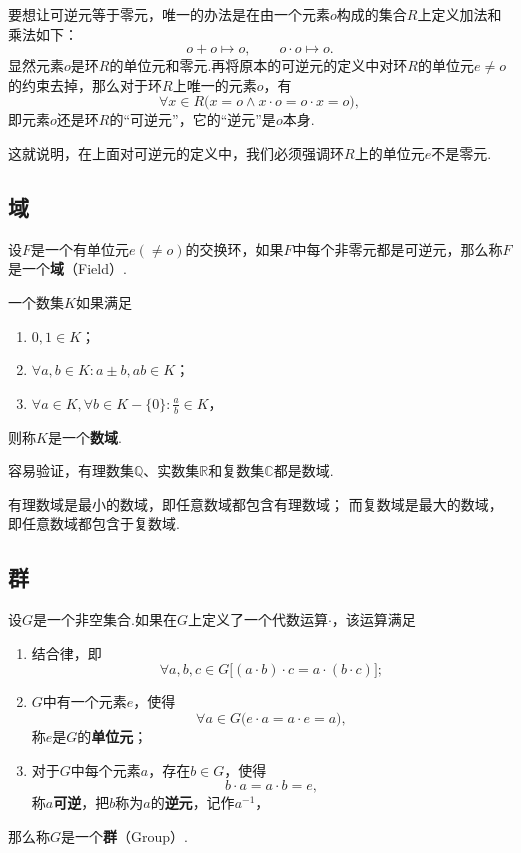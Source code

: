 \begin{example}
要想让可逆元等于零元，唯一的办法是在由一个元素\(o\)构成的集合\(R\)上定义加法和乘法如下：\[
o + o \mapsto o,
\qquad
o \cdot o \mapsto o.
\]显然元素\(o\)是环\(R\)的单位元和零元.再将原本的可逆元的定义中对环\(R\)的单位元\(e \neq o\)的约束去掉，那么对于环\(R\)上唯一的元素\(o\)，有\[
\forall x \in R \bigl( x = o \land x \cdot o = o \cdot x = o \bigr),
\]即元素\(o\)还是环\(R\)的“可逆元”，它的“逆元”是\(o\)本身.

这就说明，在上面对可逆元的定义中，我们必须强调环\(R\)上的单位元\(e\)不是零元.
\end{example}

\subsection{域}
\begin{definition}
设\(F\)是一个有单位元\(e(\neq o)\)的交换环，如果\(F\)中每个非零元都是可逆元，那么称\(F\)是一个\textbf{域}（Field）.
\end{definition}

\begin{definition}
一个数集\(K\)如果满足\begin{enumerate}
\item \(0,1 \in K\)；
\item \(\forall a,b \in K : a \pm b, ab \in K\)；
\item \(\forall a \in K, \forall b \in K - \{0\} : \frac{a}{b} \in K\)，%
\end{enumerate}
则称\(K\)是一个\textbf{数域}.
\end{definition}
容易验证，有理数集\(\mathbb{Q}\)、实数集\(\mathbb{R}\)和复数集\(\mathbb{C}\)都是数域.

\begin{theorem}
有理数域是最小的数域，即任意数域都包含有理数域；
而复数域是最大的数域，即任意数域都包含于复数域.
\end{theorem}

\subsection{群}
\begin{definition}
设\(G\)是一个非空集合.如果在\(G\)上定义了一个代数运算\(\cdot\)，该运算满足\begin{enumerate}
\item 结合律，即\[
\forall a,b,c \in G \bigl[ (a \cdot b) \cdot c = a \cdot (b \cdot c) \bigr];
\]
\item \(G\)中有一个元素\(e\)，使得\[
\forall a \in G \bigl( e \cdot a = a \cdot e = a \bigr),
\]称\(e\)是\(G\)的\textbf{单位元}；
\item 对于\(G\)中每个元素\(a\)，存在\(b \in G\)，使得\[
b \cdot a = a \cdot b = e,
\]称\(a\)\textbf{可逆}，把\(b\)称为\(a\)的\textbf{逆元}，记作\(a^{-1}\)，%
\end{enumerate}
那么称\(G\)是一个\textbf{群}（Group）.
\end{definition}

